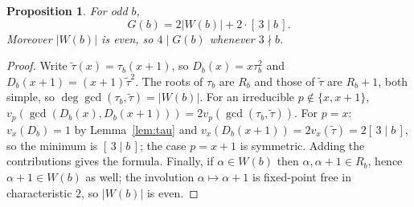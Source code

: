 \documentclass[a4paper]{article}
\newtheorem{proposition}[theorem]{Proposition}
\theoremstyle{definition}
\newcommand{\abs}[1]{\left| #1 \right|}
\begin{document}
	\begin{proposition}\label{prop:Godd}
		For odd $b$,
		\begin{equation*}
			G(b) = 2\abs{W(b)} + 2 \cdot [\,3 \mid b\,] .
		\end{equation*}
		Moreover $\abs{W(b)}$ is even, so $4 \mid G(b)$ whenever $3 \nmid b$.
	\end{proposition}
	\begin{proof}
		Write $\widetilde{\tau}(x) = \tau_b(x+1)$, so $D_b(x) = x \tau_b^2$ and $D_b(x+1) = (x+1)\widetilde{\tau}^2$.
		The roots of $\tau_b$ are $R_b$ and those of $\widetilde\tau$ are $R_b + 1$, both simple, so $\deg \gcd(\tau_b, \widetilde\tau) = \abs{W(b)}$.
		For an irreducible $p \notin \{x, x+1\}$, $v_p(\gcd(D_b(x), D_b(x+1))) = 2 v_p(\gcd(\tau_b, \widetilde\tau))$.
		For $p = x$: $v_x(D_b) = 1$ by Lemma~\ref{lem:tau} and $v_x(D_b(x+1)) = 2 v_x(\widetilde\tau) = 2 [\,3\mid b\,]$, so the minimum is $[\,3 \mid b\,]$; the case $p = x+1$ is symmetric.
		Adding the contributions gives the formula.
		Finally, if $\alpha \in W(b)$ then $\alpha, \alpha + 1 \in R_b$, hence $\alpha + 1 \in W(b)$ as well; the involution $\alpha \mapsto \alpha+1$ is fixed-point free in characteristic $2$, so $\abs{W(b)}$ is even.
	\end{proof}
\end{document}
